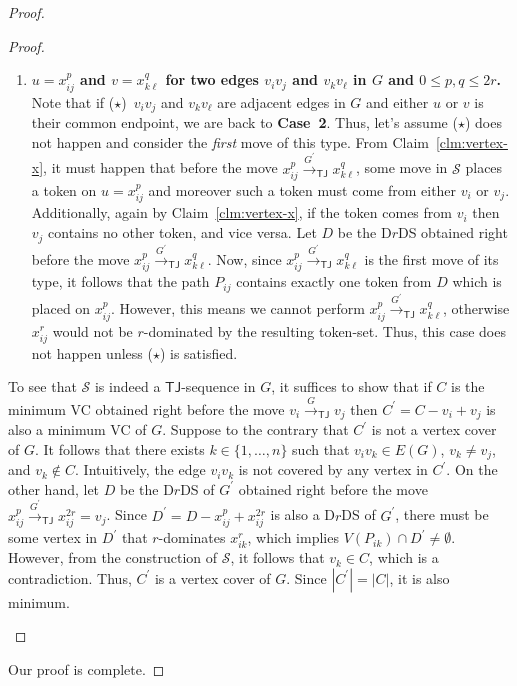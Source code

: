 \documentclass[a4paper]{article}
\theoremstyle{plain}
\theoremstyle{definition}
\newcommand{\sfTJ}{{\mathsf{TJ}}} %
\newcommand{\sfR}{{\mathsf{R}}} %
\newcommand{\calS}{{\mathcal{S}}}
\newcommand{\reconf}[2][\sfR]{\overset{#2}{\longrightarrow}_{#1}} %
\begin{document}
\begin{proof}
\begin{proof}
\begin{itemize}
\begin{enumerate}[{\bf {Case} 1:}]
				\item {\bf $u = x_{ij}^p$ and $v = x_{k\ell}^{q}$ for two edges $v_iv_j$ and $v_kv_\ell$ in $G$ and $0 \leq p, q \leq 2r$.}
				Note that if ($\star$)~$v_iv_j$ and $v_kv_\ell$ are adjacent edges in $G$ and either $u$ or $v$ is their common endpoint, we are back to {\bf Case~2}.
				Thus, let's assume ($\star$) does not happen and consider the \textit{first} move of this type.
				From Claim~\ref{clm:vertex-x}, it must happen that before the move $x_{ij}^p \reconf[\sfTJ]{G^\prime} x_{k\ell}^{q}$, some move in $\calS$ places a token on $u = x_{ij}^p$ and moreover such a token must come from either $v_i$ or $v_j$.
				Additionally, again by Claim~\ref{clm:vertex-x}, if the token comes from $v_i$ then $v_j$ contains no other token, and vice versa.
				Let $D$ be the D$r$DS obtained right before the move $x_{ij}^p \reconf[\sfTJ]{G^\prime} x_{k\ell}^{q}$.
				Now, since $x_{ij}^p \reconf[\sfTJ]{G^\prime} x_{k\ell}^{q}$ is the first move of its type, it follows that the path $P_{ij}$ contains exactly one token from $D$ which is placed on $x_{ij}^p$.
				However, this means we cannot perform $x_{ij}^p \reconf[\sfTJ]{G^\prime} x_{k\ell}^{q}$, otherwise $x_{ij}^r$ would not be $r$-dominated by the resulting token-set.
				Thus, this case does not happen unless ($\star$) is satisfied.
			\end{enumerate}
			To see that $\calS$ is indeed a $\sfTJ$-sequence in $G$, it suffices to show that if $C$ is the minimum VC obtained right before the move $v_i \reconf[\sfTJ]{G} v_j$ then $C^\prime = C - v_i + v_j$ is also a minimum VC of $G$.
			Suppose to the contrary that $C^\prime$ is not a vertex cover of $G$.
			It follows that there exists $k \in \{1, \dots, n\}$ such that $v_iv_k \in E(G)$, $v_k \neq v_j$, and $v_k \notin C$.
			Intuitively, the edge $v_iv_k$ is not covered by any vertex in $C^\prime$.
			On the other hand, let $D$ be the D$r$DS of $G^\prime$ obtained right before the move $x_{ij}^p \reconf[\sfTJ]{G^\prime} x_{ij}^{2r} = v_j$.
			Since $D^\prime = D - x_{ij}^{p} + x_{ij}^{2r}$ is also a D$r$DS of $G^\prime$, there must be some vertex in $D^\prime$ that $r$-dominates $x_{ik}^r$, which implies $V(P_{ik}) \cap D^\prime \neq \emptyset$.
			However, from the construction of $\calS$, it follows that $v_k \in C$, which is a contradiction.
			Thus, $C^\prime$ is a vertex cover of $G$.
			Since $|C^\prime| = |C|$, it is also minimum.
		\end{itemize}
	\end{proof}
	Our proof is complete.
\end{proof}
\end{document}
